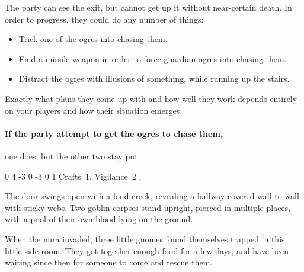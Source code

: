 \begin{multicols}{2}
\begin{boxtext}
\end{boxtext}

The party can see the exit, but cannot get up it without near-certain death.
In order to progress, they could do any number of things:

\begin{itemize}

	\item{Trick one of the ogres into chasing them.}
	\item{Find a missile weapon in order to force guardian ogres into chasing them.}
	\item{Distract the ogres with illusions of something, while running up the stairs.}

\end{itemize}

Exactly what plans they come up with and how well they work depends entirely on your players and how their situation emerges.

\paragraph{If the party attempt to get the ogres to chase them,}
one does, but the other two stay put.

\iftoggle{hardcore}{%
\npc{\N\T}{2 Guardian Ogres}
}{
\npc{\N\T}{Guardian Ogre}
}
{0}%
{4}%
{{-3}%
{0}%
{-3}}%
{0}%
{1}%
{Crafts~1, Vigilance~2}%
{\greatsword, \partialleather}%
{}

\label{chasingogre}


\begin{boxtext}

	The door swings open with a loud creek, revealing a hallway covered wall-to-wall with sticky webs.
	Two goblin corpses stand upright, pierced in multiple places, with a pool of their own blood lying on the ground.

\end{boxtext}

\begin{exampletext}

	When the nura invaded, three little gnomes found themselves trapped in this little side-room.
	They got together enough food for a few days, and have been waiting since then for someone to come and rescue them.

\end{exampletext}


\end{multicols}
